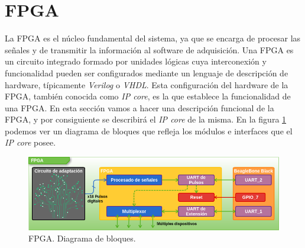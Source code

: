     \section{FPGA}
        La FPGA es el núcleo fundamental del sistema, ya que se encarga de procesar las señales y de transmitir la información al software de
        adquisición. Una FPGA es un circuito integrado formado por unidades lógicas cuya interconexión y funcionalidad pueden ser configurados
        mediante un lenguaje de descripción de hardware, típicamente \emph{Verilog} o \emph{VHDL}. Esta configuración del hardware de la FPGA, también
        conocida como \emph{IP core}, es la que establece la funcionalidad de una FPGA. En esta sección vamos a hacer una descripción funcional de la
        FPGA, y por consiguiente se describirá el \emph{IP core} de la misma. En la figura \ref{fig:fpga} podemos ver un diagrama de bloques que
        refleja los módulos e interfaces que el \emph{IP core} posee.
        \begin{figure}[h]
            \centering
            \includegraphics[keepaspectratio, width=1\textwidth]{./img/fpga.png}
            \caption{FPGA. Diagrama de bloques.}
            \label{fig:fpga}
        \end{figure}	
